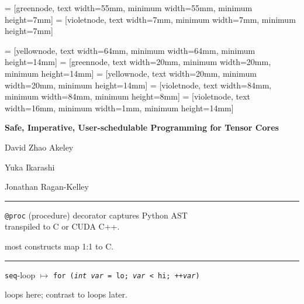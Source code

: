  = [greennode, text width=55mm, minimum width=55mm, minimum height=7mm]
 = [violetnode, text width=7mm, minimum width=7mm, minimum height=7mm]

 = [yellownode, text width=64mm, minimum width=64mm, minimum height=14mm]
 = [greennode, text width=20mm, minimum width=20mm, minimum height=14mm]
 = [yellownode, text width=20mm, minimum width=20mm, minimum height=14mm]
 = [violetnode, text width=84mm, minimum width=84mm, minimum height=8mm]
 = [violetnode, text width=16mm, minimum width=1mm, minimum height=14mm]
\newcommand{\consumerBox}[1]{{\color{greenBoxFg}\colorbox{greenBoxBg}{#1}}}
\newcommand{\producerBox}[1]{{\color{yellowBoxFg}\colorbox{yellowBoxBg}{#1}}}


\textbf{\hfill \large Safe, Imperative, User-schedulable Programming for Tensor Cores}

{\LARGE

\vfill

David Zhao Akeley

Yuka Ikarashi

Jonathan Ragan-Kelley

\hfill {}}


\newpage
{}

{\large

}

\vspace{3mm}
\hrule

{\LARGE
\texttt{@proc} (procedure) decorator captures Python AST\\transpiled to C or CUDA C++.

 most constructs map 1:1 to C.

}

\newpage
{}

{\large

}

\vspace{3mm}
\hrule

{\LARGE
\texttt{seq}-loop $\mapsto$ \texttt{for (\textit{int var} = lo; \textit{var} < hi; ++\textit{var})}

 loops here; contrast to  loops later.

}

